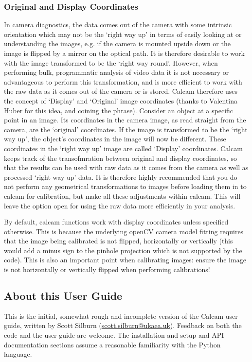 \documentclass[12pt]{article}
\begin{document}
\subsubsection{Original and Display Coordinates}
\label{sec:im_coords}
In camera diagnostics, the data comes out of the camera with some intrinsic orientation which may not be the `right way up' in terms of easily looking at or understanding the images, e.g. if the camera is mounted upside down or the image is flipped by a mirror on the optical path. It is therefore desirable to work with the image transformed to be the `right way round'. However, when performing bulk, programmatic analysis of video data it is not necessary or advantageous to perform this transformation, and is more efficient to work with the raw data as it comes out of the camera or is stored. Calcam therefore uses the concept of `Display' and `Original' image coordinates (thanks to Valentina Huber for this idea, and coining the phrase). Consider an object at a specific point in an image. Its coordinates in the camera image, as read straight from the camera, are the `original' coordinates. If the image is transformed to be the `right way up', the object's coordinates in the image will now be different. These coordinates in the `right way up' image are called `Display' coordinates. Calcam keeps track of the transofmration between original and display coordinates, so that the results can be used with raw data as it comes from the camera as well as processed `right way up' data. It is therefore highly recommended that you do not perform any geometrical transformations to images before loading them in to calcam for calibration, but make all these adjustments within calcam. This will leave the option open for using the raw data more efficiently in your analysis.

By default, calcam functions work with display coordinates unless specified otherwise. This is because the underlying openCV camera model fitting requires that the image being calibrated is not flipped, horizontally or vertically (this would add a minus sign to the pinhole projection which is not supported by the code). This is also an important point when calibrating images: ensure the image is not horizontally or vertically flipped when performing calibrations!

\subsection{About this User Guide}
This is the initial, somewhat rough and incomplete version of the Calcam user guide, written by Scott Silburn (\url{scott.silburn@ukaea.uk}). Feedback on both the code and the user guide are welcome. The installation and setup and API documentation sections assume a reasonable familiarity with the Python language.
\end{document}
